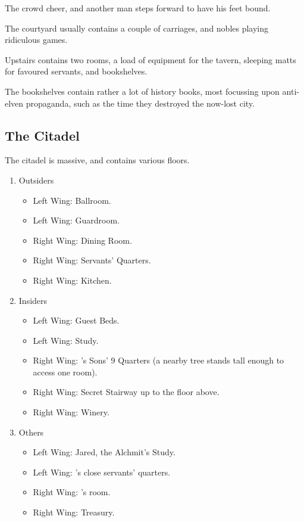 \begin{multicols}{2}
\begin{boxtext}
	The crowd cheer, and another man steps forward to have his feet bound.

\end{boxtext}

The courtyard usually contains a couple of carriages, and nobles playing ridiculous games.


Upstairs contains two rooms, a load of equipment for the tavern, sleeping matts for favoured servants, and bookshelves.

\noindent

The bookshelves contain rather a lot of history books, most focussing upon anti-elven propaganda, such as the time they destroyed the now-lost city.
 
\subsection{The Citadel}\label{citadel}
The citadel is massive, and contains various floors.

\begin{enumerate}

	\item{Outsiders}
		\begin{itemize}
			\item{Left Wing: Ballroom.}
			\item{Left Wing: Guardroom.}
			\item{Right Wing: Dining Room.}
			\item{Right Wing: Servants' Quarters.}
			\item{Right Wing: Kitchen.}
		\end{itemize}
	\item{Insiders}
		\begin{itemize}
			\item{Left Wing: Guest Beds.}
			\item{Left Wing: Study.}
			\item{Right Wing: 's Sons' 9 Quarters (a nearby tree stands tall enough to access one room).}
			\item{Right Wing: Secret Stairway up to the floor above.}
			\item{Right Wing: Winery.}
		\end{itemize}

	\item{Others}
		\begin{itemize}
			\item{Left Wing: Jared, the Alchmit's Study.}
			\item{Left Wing: 's close servants' quarters.}
			\item{Right Wing: 's room.}
			\item{Right Wing: Treasury.}
		\end{itemize}


\end{enumerate}
\end{multicols}
